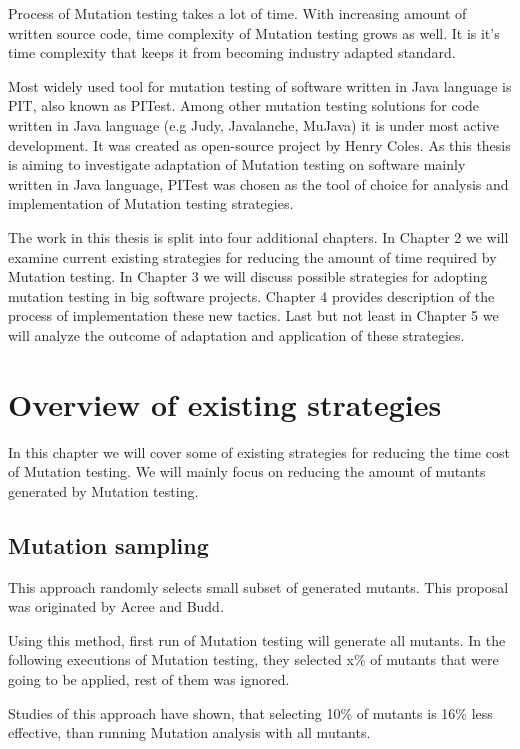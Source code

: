 \documentclass[
  digital, %
  table,   %
  lof,     %
  lot,     %
]{fithesis3}
\begin{document}
\par Process of Mutation testing takes a lot of time. With increasing amount of written source code, time complexity of Mutation testing grows as well. It is it's time complexity that keeps it from becoming industry adapted standard.
\par Most widely used tool for mutation testing of software written in Java language is PIT, also known as PITest. Among other mutation testing solutions for code written in Java language (e.g Judy, Javalanche, MuJava) it is under most active development. It was created as open-source project by Henry Coles. As this thesis is aiming to investigate adaptation of Mutation testing on software mainly written in Java language, PITest was chosen as the tool of choice for analysis and implementation of Mutation testing strategies.

\par The work in this thesis is split into four additional chapters. In Chapter 2 we will examine current existing strategies for reducing the amount of time required by Mutation testing. In Chapter 3 we will discuss possible strategies for adopting mutation testing in big software projects. Chapter 4 provides description of the process of implementation these new tactics. Last but not least in Chapter 5 we will analyze the outcome of adaptation and application of these strategies.
\chapter{Overview of existing strategies}
In this chapter we will cover some of existing strategies for reducing the time cost of Mutation testing. We will mainly focus on reducing the amount of mutants generated by Mutation testing.
\section{Mutation sampling}
This approach randomly selects small subset of generated mutants. This proposal was originated by Acree  and Budd. \par Using this method, first run of Mutation testing will generate all mutants. In the following executions of Mutation testing, they selected x\% of mutants that were going to be applied, rest of them was ignored. 
\par Studies of this approach have shown, that selecting 10\% of mutants is 16\% less effective, than running Mutation analysis with all mutants.
\end{document}

